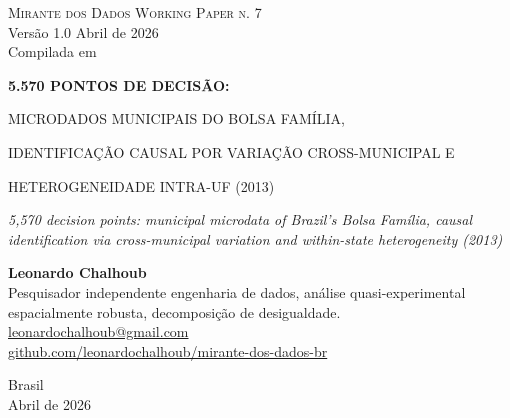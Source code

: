 \documentclass[12pt,a4paper,oneside]{article}
\begin{document}
\begin{titlepage}
  \begin{center}
    \vspace*{1.5cm}
    {\small\textsc{Mirante dos Dados \quad\textbar\quad Working Paper n. 7}}\\
    {\small Versão 1.0 \textemdash{} Abril de 2026}\\[2pt]
    {\footnotesize Compilada em \COMPILESTAMP\ \textbullet\ \texttt{\COMPILESHA}}

    \vfill

    {\LARGE\bfseries
     5.570 PONTOS DE DECISÃO:

     MICRODADOS MUNICIPAIS DO
     BOLSA FAMÍLIA,

     IDENTIFICAÇÃO CAUSAL POR
     VARIAÇÃO CROSS-MUNICIPAL E

     HETEROGENEIDADE INTRA-UF
     (2013)}

    \vspace{1cm}
    {\large\itshape
     5{,}570 decision points: municipal microdata of Brazil's Bolsa
     Família, causal identification via cross-municipal variation and
     within-state heterogeneity (2013)}

    \vfill

    {\large\textbf{Leonardo Chalhoub}}\\[4pt]
    {\small Pesquisador independente \textemdash{} engenharia de dados,
     análise quasi-experimental espacialmente robusta,
     decomposição de desigualdade.}\\[2pt]
    {\small\href{mailto:leonardochalhoub@gmail.com}{leonardochalhoub@gmail.com}}\\
    {\small\href{https://github.com/leonardochalhoub/mirante-dos-dados-br}{github.com/leonardochalhoub/mirante-dos-dados-br}}

    \vfill

    {\small Brasil \\ Abril de 2026}
  \end{center}
\end{titlepage}

\end{document}
